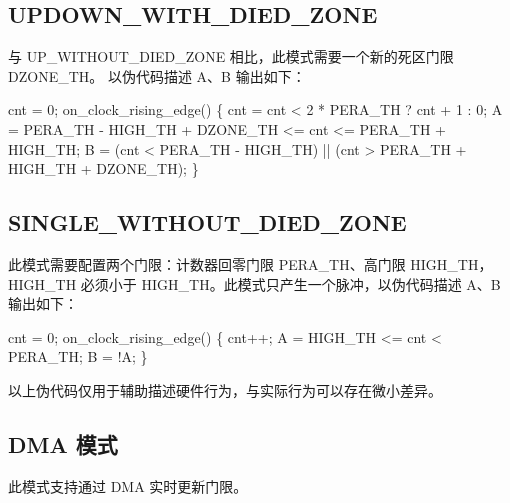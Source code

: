 \documentclass[
  12pt,
]{book}
\makeatletter
\newenvironment{Shaded}{\begin{snugshade}}{\end{snugshade}}
\newcommand{\DecValTok}[1]{\textcolor[rgb]{0.00,0.00,0.81}{#1}}
\newcommand{\NormalTok}[1]{#1}
\newenvironment{kframe}{%
\medskip{}
\setlength{\fboxsep}{.8em}
 \def\at@end@of@kframe{}%
 \ifinner\ifhmode%
  \def\at@end@of@kframe{\end{minipage}}%
  \begin{minipage}{\columnwidth}%
 \fi\fi%
 \def\FrameCommand##1{\hskip\@totalleftmargin \hskip-\fboxsep
 \colorbox{shadecolor}{##1}\hskip-\fboxsep
     \hskip-\linewidth \hskip-\@totalleftmargin \hskip\columnwidth}%
 \MakeFramed {\advance\hsize-\width
   \@totalleftmargin\z@ \linewidth\hsize
   \@setminipage}}%
 {\par\unskip\endMakeFramed%
 \at@end@of@kframe}
\newenvironment{rmdblock}[1]
  {
  \begin{itemize}
  \renewcommand{\labelitemi}{
    \raisebox{-.7\height}[0pt][0pt]{
      {\setkeys{Gin}{width=3em,keepaspectratio}\texttt{[image: images/\#1]}}
    }
  }
  \setlength{\fboxsep}{1em}
  \begin{kframe}
  \item
  }
  {
  \end{kframe}
  \end{itemize}
  }
\newenvironment{rmdcaution}
  {\begin{rmdblock}{caution}}
  {\end{rmdblock}}
\makeatother
\begin{document}
\hypertarget{updown_with_died_zone}{%
\subsection{UPDOWN\_WITH\_DIED\_ZONE}\label{updown_with_died_zone}}

与 UP\_WITHOUT\_DIED\_ZONE 相比，此模式需要一个新的死区门限 DZONE\_TH。
以伪代码描述 A、B 输出如下：

\begin{Shaded}
\begin{Highlighting}[]
\NormalTok{cnt = }\DecValTok{0}\NormalTok{;}
\NormalTok{on_clock_rising_edge()}
\NormalTok{\{}
\NormalTok{    cnt = cnt < }\DecValTok{2}\NormalTok{ * PERA_TH ? cnt + }\DecValTok{1}\NormalTok{ : }\DecValTok{0}\NormalTok{;}
\NormalTok{    A = PERA_TH - HIGH_TH + DZONE_TH <= cnt <= PERA_TH + HIGH_TH;}
\NormalTok{    B = (cnt < PERA_TH - HIGH_TH) || (cnt > PERA_TH + HIGH_TH + DZONE_TH);}
\NormalTok{\}}
\end{Highlighting}
\end{Shaded}

\hypertarget{single_without_died_zone}{%
\subsection{SINGLE\_WITHOUT\_DIED\_ZONE}\label{single_without_died_zone}}

此模式需要配置两个门限：计数器回零门限 PERA\_TH、高门限 HIGH\_TH，HIGH\_TH
必须小于 HIGH\_TH。此模式只产生一个脉冲，以伪代码描述 A、B 输出如下：

\begin{Shaded}
\begin{Highlighting}[]
\NormalTok{cnt = }\DecValTok{0}\NormalTok{;}
\NormalTok{on_clock_rising_edge()}
\NormalTok{\{}
\NormalTok{    cnt++;}
\NormalTok{    A = HIGH_TH <= cnt < PERA_TH;}
\NormalTok{    B = !A;}
\NormalTok{\}}
\end{Highlighting}
\end{Shaded}

\begin{rmdcaution}
以上伪代码仅用于辅助描述硬件行为，与实际行为可以存在微小差异。
\end{rmdcaution}

\hypertarget{dma-ux6a21ux5f0f}{%
\subsection{DMA 模式}\label{dma-ux6a21ux5f0f}}

此模式支持通过 DMA 实时更新门限。
\end{document}
